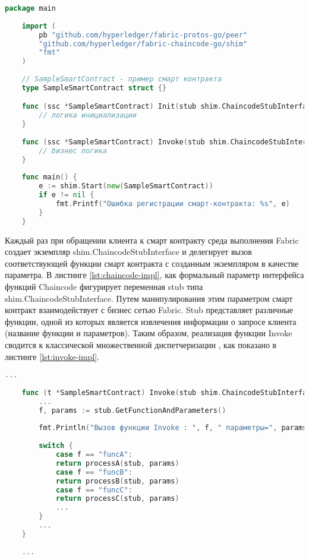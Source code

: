 \begin{lstlisting}[caption={Реализация Chaincode},label={lst:chaincode-impl},language=Go]
	package main
	
	import (
		pb "github.com/hyperledger/fabric-protos-go/peer"
		"github.com/hyperledger/fabric-chaincode-go/shim"
		"fmt"
	)
	
	// SampleSmartContract - пример смарт контракта
	type SampleSmartContract struct {}

	func (ssc *SampleSmartContract) Init(stub shim.ChaincodeStubInterface) pb.Response {
		// логика инициализации
	}
	
	func (ssc *SampleSmartContract) Invoke(stub shim.ChaincodeStubInterface) pb.Response {
		// бизнес логика
	}
	
	func main() {
		e := shim.Start(new(SampleSmartContract))
		if e != nil {
			fmt.Printf("Ошибка регистрации смарт-контракта: %s", e)
		}
	}
\end{lstlisting}


Каждый раз при обращении клиента к смарт контракту среда выполнения Fabric создает экземпляр shim.ChaincodeStubInterface и делегирует вызов соответствующей функции смарт контракта с созданным экземпляром в качестве параметра. В листинге \ref{lst:chaincode-impl}, как формальный параметр интерфейса функций Chaincode фигурирует переменная stub типа shim.ChaincodeStubInterface. Путем манипулирования этим параметром смарт контракт взаимодействует с бизнес сетью Fabric. Stub представляет различные функции, одной из которых является извлечения информации о запросе клиента (название функции и параметров). Таким образом, реализация функции Invoke сводится к классической множественной диспетчеризации \cite{solid}, как показано в листинге \ref{lst:invoke-impl}.

\begin{lstlisting}[caption={Шаблон реализации Chaincode.Invoke},label={lst:invoke-impl},language=Go]
	...
	
	func (t *SampleSmartContract) Invoke(stub shim.ChaincodeStubInterface) pb.Response {
		...
		f, params := stub.GetFunctionAndParameters()
		
		fmt.Println("Вызов функции Invoke : ", f, " параметры=", params)
		
		switch {
			case f == "funcA":
			return processA(stub, params)
			case f == "funcB":
			return processB(stub, params)
			case f == "funcC":
			return processC(stub, params)
			...
		}
		...
	}
	
	...
\end{lstlisting}

